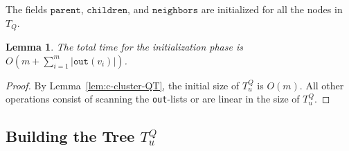 \documentclass[11pt]{paper}
\newtheorem {lem}[theorem] {Lemma}
\begin{document}
The fields $\texttt{parent}$, $\texttt{children}$, and $\texttt{neighbors}$
are initialized for all the nodes in $T_Q$.

\begin{lem}\label{lem:node-init}
The total time for the initialization phase is
\emph{$O(m + \sum_{i=1}^{m} |\texttt{out}(v_i)|)$}.
\end{lem}

\begin{proof}
By Lemma~\ref{lem:c-cluster-QT}, the initial size of $T_u^Q$ is $O(m)$.
All other operations consist of scanning the \texttt{out}-lists
or are linear in the size of $T_u^Q$.
\end{proof}

\subsection {Building the Tree $T_u^Q$}
\end{document}
